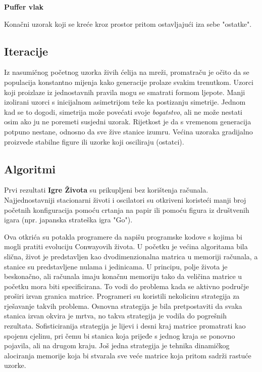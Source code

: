 \documentclass[11pt]{article}
\begin{document}
\textbf{Puffer vlak}

Konačni uzorak koji se kreće kroz prostor pritom ostavljajući iza sebe
"ostatke". 

    \subsection{Iteracije}\label{iteracije}

Iz nasumičnog početnog uzorka živih ćelija na mreži, promatraču je očito
da se populacija konstantno mijenja kako generacije prolaze svakim
trenutkom. Uzorci koji proizlaze iz jednostavnih pravila mogu se
smatrati formom ljepote. Manji izolirani uzorci s inicijalnom
asimetrijom teže ka postizanju simetrije. Jednom kad se to dogodi,
simetrija može povećati svoje \emph{bogatstvo}, ali ne može nestati osim
ako ju ne poremeti susjedni uzorak. Rijetkost je da s vremenom
generacija potpuno nestane, odnosno da sve žive stanice izumru. Većina
uzoraka gradijalno proizvede stabilne figure ili uzorke koji osciliraju
(ostatci).

    \subsection{Algoritmi}\label{algoritmi}

Prvi rezultati \textbf{Igre Života} su prikupljeni bez korištenja
računala. Najjednostavniji stacionarni životi i oscilatori su otkriveni
koristeći manji broj početnih konfiguracija pomoću crtanja na papir ili
pomoću figura iz društvenih igara (npr. japanska strateška igra "Go").

Ova otkrića su potakla programere da napišu programske kodove s kojima
bi mogli pratiti evoluciju Conwayovih života. U početku je većina
algoritama bila slična, život je predstavljen kao dvodimenzionalna
matrica u memoriji računala, a stanice su predstavljene nulama i
jedinicama. U principu, polje života je beskonačno, ali računala imaju
konačnu memoriju tako da veličina matrice u početku mora biti
specificirana. To vodi do problema kada se aktivno područje proširi
izvan granica matrice. Programeri su koristili nekolicinu strategija za
rješavanje takvih problema. Osnovna strategija je bila pretpostaviti da
svaka stanica izvan okvira je mrtva, no takva strategija je vodila do
pogrešnih rezultata. Sofisticiranija strategija je lijevi i desni kraj
matrice promatrati kao spojenu cjelinu, pri čemu bi stanica koja prijeđe
s jednog kraja se ponovno pojavila, ali na drugom kraju. Još jedna
strategija je tehnika dinamičkog alociranja memorije koja bi stvarala
sve veće matrice koja pritom sadrži rastuće uzorke.
\end{document}
